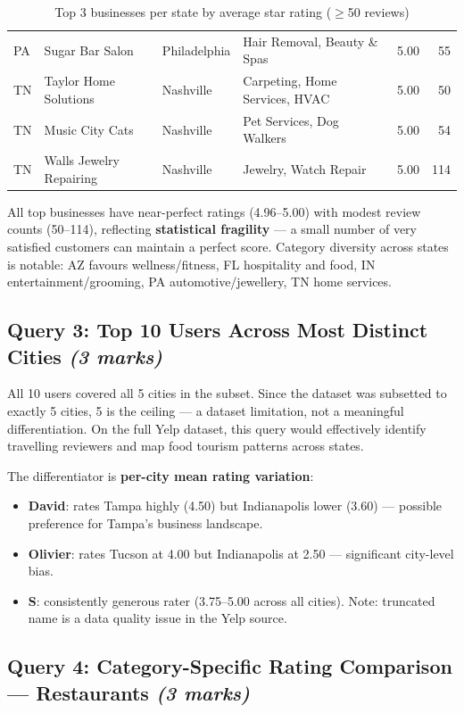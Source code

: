 \documentclass[12pt,a4paper]{article}
\newcommand{\marks}[1]{\hfill\textit{(#1 marks)}}
\begin{document}
\begin{table}[H]
\begin{tabularx}{\textwidth}{llp{2.2cm}>{\raggedright\arraybackslash}Xrr}
    PA & Sugar Bar Salon              & Philadelphia & Hair Removal, Beauty \& Spas    & 5.00 & 55 \\
    TN & Taylor Home Solutions        & Nashville    & Carpeting, Home Services, HVAC  & 5.00 & 50 \\
    TN & Music City Cats              & Nashville    & Pet Services, Dog Walkers       & 5.00 & 54 \\
    TN & Walls Jewelry Repairing      & Nashville    & Jewelry, Watch Repair           & 5.00 & 114 \\
    \bottomrule
  \end{tabularx}
  \caption{Top 3 businesses per state by average star rating ($\geq$50 reviews)}
\end{table}

All top businesses have near-perfect ratings (4.96--5.00) with modest review
counts (50--114), reflecting \textbf{statistical fragility} --- a small number
of very satisfied customers can maintain a perfect score. Category diversity
across states is notable: AZ favours wellness/fitness, FL hospitality and
food, IN entertainment/grooming, PA automotive/jewellery, TN home services.

\subsection{Query 3: Top 10 Users Across Most Distinct Cities \marks{3}}

All 10 users covered all 5 cities in the subset. Since the dataset was
subsetted to exactly 5 cities, 5 is the ceiling --- a dataset limitation, not
a meaningful differentiation. On the full Yelp dataset, this query would
effectively identify travelling reviewers and map food tourism patterns across
states.

The differentiator is \textbf{per-city mean rating variation}:
\begin{itemize}
  \item \textbf{David}: rates Tampa highly (4.50) but Indianapolis lower
    (3.60) --- possible preference for Tampa's business landscape.
  \item \textbf{Olivier}: rates Tucson at 4.00 but Indianapolis at 2.50 ---
    significant city-level bias.
  \item \textbf{S}: consistently generous rater (3.75--5.00 across all
    cities). Note: truncated name is a data quality issue in the Yelp source.
\end{itemize}

\subsection{Query 4: Category-Specific Rating Comparison --- Restaurants \marks{3}}
\end{document}
